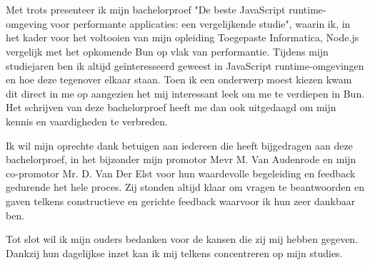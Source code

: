 
\chapter*{}%
\label{ch:voorwoord}


Met trots presenteer ik mijn bachelorproef "De beste JavaScript runtime-omgeving voor performante applicaties: een vergelijkende studie", 
waarin ik, in het kader voor het voltooien van mijn opleiding Toegepaste Informatica, Node.js vergelijk met het opkomende Bun op vlak van performantie.
Tijdens mijn studiejaren ben ik altijd geïnteresseerd geweest in JavaScript runtime-omgevingen en
hoe deze tegenover elkaar staan. Toen ik een onderwerp moest kiezen kwam dit direct in me op aangezien het mij interessant leek om me te verdiepen 
in Bun. Het schrijven van deze bachelorproef heeft me dan ook uitgedaagd om mijn kennis en vaardigheden te verbreden.
\vspace{5mm}

Ik wil mijn oprechte dank betuigen aan iedereen die heeft bijgedragen aan deze bachelorproef, 
in het bijzonder mijn promotor Mevr M. Van Audenrode en mijn co-promotor Mr. D. Van Der Elst voor hun
waardevolle begeleiding en feedback gedurende het hele proces. 
Zij stonden altijd klaar om vragen te beantwoorden en gaven telkens constructieve en gerichte feedback waarvoor ik hun zeer dankbaar ben.
\vspace{5mm}

Tot slot wil ik mijn ouders bedanken voor de kansen die zij mij hebben gegeven. 
Dankzij hun dagelijkse inzet kan ik mij telkens concentreren op mijn studies.


